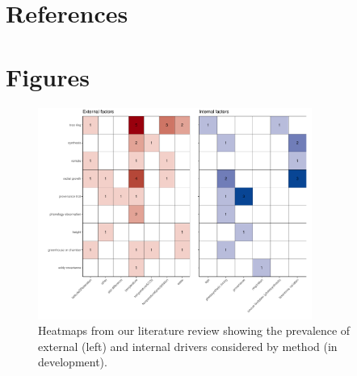 \documentclass[11pt]{article}
\begin{document}


\clearpage
\section*{References}



\section*{Figures}


\clearpage
\begin{figure}[h!]
\includegraphics[width=0.8\textwidth]{..//figures/heatmaps/heatmap_combined_endo&exo.pdf}
\caption{Heatmaps from our literature review showing the prevalence of external (left) and internal drivers considered by method (in development).}
\label{fig:heatmapssupp}
\end{figure}
\end{document}
